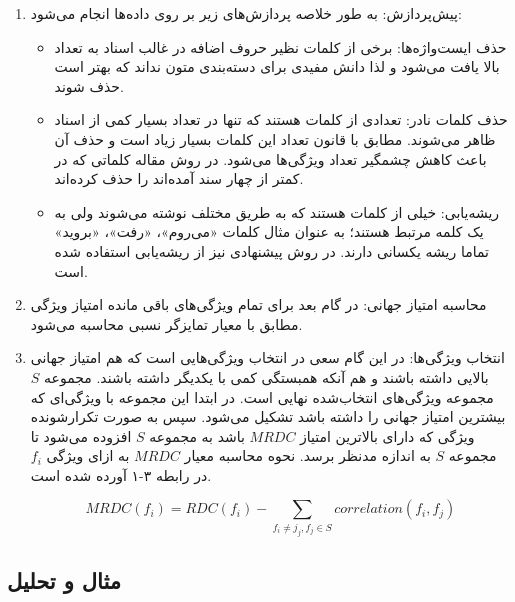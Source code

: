 \begin{enumerate}
\item پیش‌پردازش: به طور خلاصه پردازش‌های زیر بر روی داده‌ها انجام می‌شود:

\begin{itemize}

\item حذف ایست‌واژه‌‌ها: برخی از کلمات نظیر حروف اضافه در غالب اسناد به تعداد بالا یافت می‌شود و لذا دانش مفیدی برای دسته‌بندی متون نداند که بهتر است حذف شوند.
\item حذف کلمات نادر: تعدادی از کلمات هستند که تنها در تعداد بسیار کمی از اسناد ظاهر می‌شوند. مطابق با قانون  تعداد این کلمات بسیار زیاد است و حذف آن باعث کاهش چشمگیر تعداد ویژگی‌ها می‌شود. در روش مقاله کلماتی که در کمتر از چهار سند آمده‌اند را حذف کرده‌اند.
\item ریشه‌یابی: خیلی از کلمات هستند که به طریق مختلف نوشته می‌شوند ولی به یک کلمه مرتبط هستند؛ به عنوان مثال کلمات «می‌روم»، «رفت»، «بروید» تماما ریشه یکسانی دارند. در روش پیشنهادی نیز از ریشه‌یابی استفاده شده است.
\end{itemize}

\item محاسبه امتیاز جهانی: در گام بعد برای تمام ویژگی‌های باقی مانده امتیاز ویژگی مطابق با معیار تمایزگر نسبی محاسبه می‌شود.

\item انتخاب ویژگی‌‌ها: در این گام سعی در انتخاب ویژگی‌هایی است که هم امتیاز جهانی بالایی داشته باشند و هم آنکه همبستگی کمی با یکدیگر داشته باشند. مجموعه 
$S$
مجموعه ویژگی‌های انتخاب‌شده نهایی است. در ابتدا این مجموعه با ویژگی‌ای که بیشترین امتیاز جهانی را داشته باشد تشکیل می‌شود. سپس به صورت تکرارشونده ویژگی که دارای بالاترین امتیاز 
$MRDC$
باشد به مجموعه
$S$
افزوده می‌شود تا مجموعه
$S$
به اندازه مدنظر برسد. نحوه محاسبه معیار
$MRDC$
به ازای ویژگی 
$f_i$
در رابطه ۳-۱ آورده شده است.

\begin{equation}
MRDC(f_i) = RDC(f_i) - \sum_{f_i \ne j_j, f_j \in S} correlation(f_i, f_j)
\end{equation}
 
\end{enumerate}

\subsection{مثال و تحلیل}


